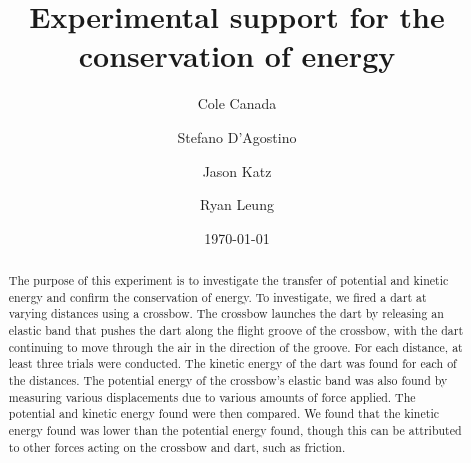\documentclass[reprint,amsmath,amssymb,aps,twoside]{revtex4-2}
\begin{document}
\setcounter{page}{63}
\title{Experimental support for the conservation of energy}

\author{Cole Canada}
\author{Stefano D'Agostino}
\author{Jason Katz}
\author{Ryan Leung}
\date{\today}

\begin{abstract}
The purpose of this experiment is to investigate the transfer of potential and kinetic energy and confirm the conservation of energy. To investigate, we fired a dart at varying distances using a crossbow. The crossbow launches the dart by releasing an elastic band that pushes the dart along the flight groove of the crossbow, with the dart continuing to move through the air in the direction of the groove. For each distance, at least three trials were conducted. The kinetic energy of the dart was found for each of the distances. The potential energy of the crossbow’s elastic band was also found by measuring various displacements due to various amounts of force applied. The potential and kinetic energy found were then compared. We found that the kinetic energy found was lower than the potential energy found, though this can be attributed to other forces acting on the crossbow and dart, such as friction.
\end{abstract}


\maketitle\thispagestyle{mytitlepage}
\end{document}
